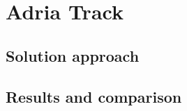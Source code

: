 \section{Adria Track}
%
\subsection{Solution approach}
%
\subsection{Results and comparison}
%

\begin{figure}[ht!]
    \centering
    \caption{}
    \label{fig:AdriaTrack}
\end{figure}
%